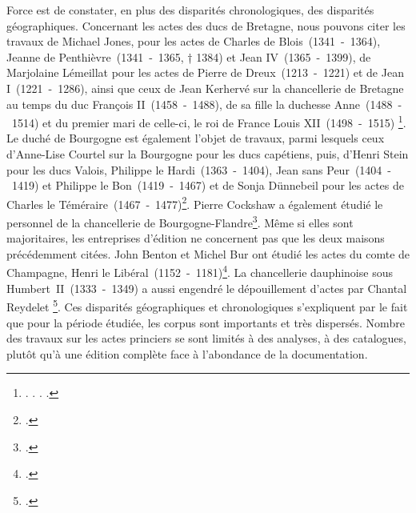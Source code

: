 \par Force est de constater, en plus des disparités chronologiques, des disparités géographiques. Concernant les actes des ducs de Bretagne, nous pouvons citer les travaux de Michael Jones, pour les actes de Charles de Blois~(1341~-~1364), Jeanne de Penthièvre~(1341~-~1365, † 1384) et Jean \textsc{IV}~(1365~-~1399), de Marjolaine Lémeillat pour les actes de Pierre de Dreux~(1213~-~1221) et de Jean I~(1221~-~1286), ainsi que ceux de Jean Kerhervé sur la chancellerie de Bretagne au temps du duc François \textsc{II}~(1458~-~1488), de sa fille la duchesse Anne~(1488~-~1514) et du premier mari de celle-ci, le roi de France Louis \textsc{XII}~(1498~-~1515) \footnote{\cite{jonesRecueilActesCharles2016}. \newline \cite{jonesRecueilActesJean1980}. \newline \cite{lemeillatActesPierreDreux2013}. \newline \cite{kerherveChancellerieBretagneSous2001}.}. Le duché de Bourgogne est également l'objet de travaux, parmi lesquels ceux d'Anne-Lise Courtel sur la Bourgogne pour les ducs capétiens, puis, d'Henri Stein pour les ducs Valois, Philippe le Hardi~(1363~-~1404), Jean sans Peur~(1404~-~1419) et Philippe le Bon~(1419~-~1467) et de Sonja Dünnebeil pour les actes de Charles le Téméraire~(1467~-~1477)\footnote{\cite{courtelChancellerieActesEudes1977} \newline \cite{steinCatalogueActesCharles1999}.}. Pierre Cockshaw a également étudié le personnel de la chancellerie de Bourgogne-Flandre\footnote{\cite{cockshawPersonnelChancellerieBourgogneFlandre1982}.}. Même si elles sont majoritaires, les entreprises d'édition ne concernent pas que les deux maisons précédemment citées. John Benton et Michel Bur ont étudié les actes du comte de Champagne, Henri le Libéral~(1152~-~1181)\footnote{\cite{bentonRecueilActesHenri2009}.}. La chancellerie dauphinoise sous Humbert~II~(1333~-~1349) a aussi engendré le dépouillement d'actes par Chantal Reydelet \footnote{\cite{reydeletChancellerieHumbertII1974}.}. Ces disparités géographiques et chronologiques s'expliquent par le fait que pour la période étudiée, les corpus sont importants et très dispersés. Nombre des travaux sur les actes princiers se sont limités à des analyses, à des catalogues, plutôt qu'à une édition complète face à l'abondance de la documentation. 
\newpage 

